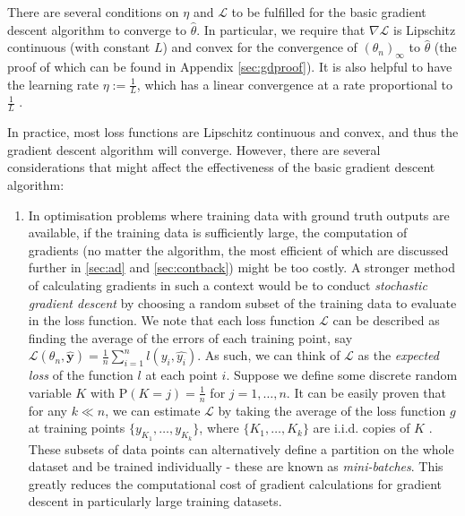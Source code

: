 \documentclass[a4paper,11pt,titlepage]{article}
\theoremstyle{definition}
\theoremstyle{plain}
\theoremstyle{remark}
\begin{document}
There are several conditions on $\eta$ and $\mathcal{L}$ to be fulfilled for the basic gradient descent algorithm to converge to $\hat{\theta}$. In particular, we require that $\nabla\mathcal{L}$ is Lipschitz continuous (with constant $L$) and convex for the convergence of $(\theta_n)_\infty$ to $\hat{\theta}$ (the proof of which can be found in Appendix \ref{sec:gdproof}). It is also helpful to have the learning rate $\eta := \frac{1}{L}$, which has a linear convergence at a rate proportional to $\frac{1}{L}$ \cite{gower2015}.

In practice, most loss functions are Lipschitz continuous and convex, and thus the gradient descent algorithm will converge. However, there are several considerations that might affect the effectiveness of the basic gradient descent algorithm:
\begin{enumerate}
    \item In optimisation problems where training data with ground truth outputs are available, if the training data is sufficiently large, the computation of gradients (no matter the algorithm, the most efficient of which are discussed further in \ref{sec:ad} and \ref{sec:contback}) might be too costly. A stronger method of calculating gradients in such a context would be to conduct \textit{stochastic gradient descent} by choosing a random subset of the training data to evaluate in the loss function. We note that each loss function $\mathcal{L}$ can be described as finding the average of the errors of each training point, say $\mathcal{L}(\theta_n,\mathbf{\hat{y}}) = \frac{1}{n} \sum_{i=1}^n l(y_i, \hat{y_i})$. As such, we can think of $\mathcal{L}$ as the \textit{expected loss} of the function $l$ at each point $i$. Suppose we define some discrete random variable $K$ with $\mathrm{P}(K = j) = \frac{1}{n}$ for $j = 1, \dots, n$. It can be easily proven that for any $k \ll n$, we can estimate $\mathcal{L}$ by taking the average of the loss function $g$ at training points $\{y_{K_1}, \dots, y_{K_k}\}$, where $\{K_1, \dots, K_k\}$ are i.i.d. copies of $K$ \cite{kroese2019}. These subsets of data points can alternatively define a partition on the whole dataset and be trained individually - these are known as \textit{mini-batches}. This greatly reduces the computational cost of gradient calculations for gradient descent in particularly large training datasets. 
    

\end{enumerate}
\end{document}
